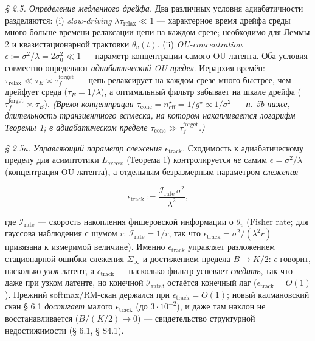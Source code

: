 \documentclass[12pt]{iopart}
\begin{document}
\emph{§ 2.5. Определение медленного дрейфа.} Два различных условия адиабатичности \cite{Andriishin2026b} разделяются: (i) \emph{slow-driving} \(\lambda\tau_{\text{relax}} \ll 1\) --- характерное время дрейфа среды много больше времени релаксации цепи на каждом срезе; необходимо для Леммы 2 и квазистационарной трактовки \(\theta_v(t)\). (ii) \emph{OU-concentration} \(\epsilon := \sigma^2/\lambda = 2\sigma_0^2 \ll 1\) --- параметр концентрации самого OU-латента. Оба условия совместно определяют \emph{адиабатический OU-предел}. Иерархия времён: \(\tau_{\text{relax}} \ll \tau_E \asymp \tau_f^{\text{forget}}\) --- цепь релаксирует на каждом срезе много быстрее, чем дрейфует среда (\(\tau_E = 1/\lambda\)), а оптимальный фильтр забывает на шкале дрейфа (\(\tau_f^{\text{forget}} \asymp \tau_E\)). \emph{(Время концентрации \(\tau_{\text{conc}} = n_{\text{eff}}^\star = 1/g^\star \propto 1/\sigma^2\) --- п. 5b ниже, длительность транзиентного всплеска, на котором накапливается логарифм Теоремы 1; в адиабатическом пределе \(\tau_{\text{conc}} \gg \tau_f^{\text{forget}}\).)}



\emph{§ 2.5a. Управляющий параметр слежения \(\epsilon_{\text{track}}\).} Сходимость к адиабатическому пределу для асимптотики \(L_{\text{excess}}\) (Теорема 1) контролируется \emph{не} самим \(\epsilon = \sigma^2/\lambda\) (концентрация OU-латента), а отдельным безразмерным параметром \emph{слежения}



\begin{equation}\epsilon_{\text{track}} := \frac{\mathcal I_{\text{rate}}\,\sigma^2}{\lambda^2}, \tag{2.2}\end{equation}



где \(\mathcal I_{\text{rate}}\) --- скорость накопления фишеровской информации о \(\theta_v\) (Fisher rate; для гауссова наблюдения с шумом \(r\): \(\mathcal I_{\text{rate}} = 1/r\), так что \(\epsilon_{\text{track}} = \sigma^2/(\lambda^2 r)\) привязана к измеримой величине). Именно \(\epsilon_{\text{track}}\) управляет разложением стационарной ошибки слежения \(\Sigma_\infty\) и достижением предела \(B \to K/2\): \(\epsilon\) говорит, насколько \emph{узок} латент, а \(\epsilon_{\text{track}}\) --- насколько фильтр успевает \emph{следить}, так что даже при узком латенте, но конечной \(\mathcal I_{\text{rate}}\), остаётся конечный лаг (\(\epsilon_{\text{track}} = O(1)\)). Прежний softmax/RM-скан \cite{Andriishin2026b} держался при \(\epsilon_{\text{track}} = O(1)\); новый калмановский скан § 6.1 \emph{достигает} малого \(\epsilon_{\text{track}}\) (до \(3\cdot10^{-2}\)), и даже там наклон не восстанавливается (\(B/(K/2)\to0\)) --- свидетельство структурной недостижимости (§ 6.1, § S4.1).
\end{document}
